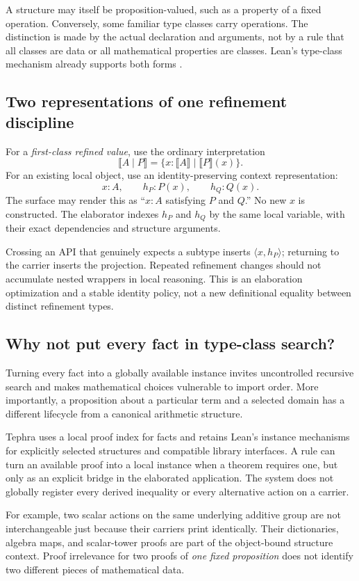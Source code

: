 \documentclass[11pt,a4paper]{article}
\newcommand{\where}{\mathrel{\vert}}
\newcommand{\den}[1]{\llbracket #1\rrbracket}
\theoremstyle{plain}
\theoremstyle{definition}
\begin{document}
A structure may itself be proposition-valued, such as a property of a fixed operation. Conversely, some familiar type classes carry operations. The distinction is made by the actual declaration and arguments, not by a rule that all classes are data or all mathematical properties are classes. Lean's type-class mechanism already supports both forms \cite{lean-classes}.

\subsection{Two representations of one refinement discipline}
For a \emph{first-class refined value}, use the ordinary interpretation
\[
 \den{A\where P}=\{x:\den A\mid \den P(x)\}.
\]
For an existing local object, use an identity-preserving context representation:
\[
 x:A,\qquad h_P:P(x),\qquad h_Q:Q(x).
\]
The surface may render this as ``$x:A$ satisfying $P$ and $Q$.'' No new $x$ is constructed. The elaborator indexes $h_P$ and $h_Q$ by the same local variable, with their exact dependencies and structure arguments.

Crossing an API that genuinely expects a subtype inserts $\langle x,h_P\rangle$; returning to the carrier inserts the projection. Repeated refinement changes should not accumulate nested wrappers in local reasoning. This is an elaboration optimization and a stable identity policy, not a new definitional equality between distinct refinement types.

\subsection{Why not put every fact in type-class search?}
Turning every fact into a globally available instance invites uncontrolled recursive search and makes mathematical choices vulnerable to import order. More importantly, a proposition about a particular term and a selected domain has a different lifecycle from a canonical arithmetic structure.

Tephra uses a local proof index for facts and retains Lean's instance mechanisms for explicitly selected structures and compatible library interfaces. A rule can turn an available proof into a local instance when a theorem requires one, but only as an explicit bridge in the elaborated application. The system does not globally register every derived inequality or every alternative action on a carrier.

For example, two scalar actions on the same underlying additive group are not interchangeable just because their carriers print identically. Their dictionaries, algebra maps, and scalar-tower proofs are part of the object-bound structure context. Proof irrelevance for two proofs of \emph{one fixed proposition} does not identify two different pieces of mathematical data.
\end{document}
